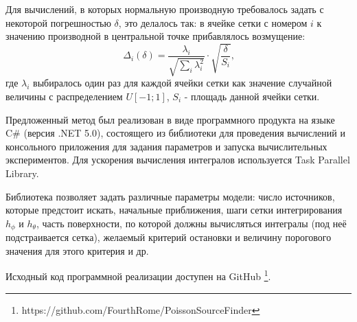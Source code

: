 Для вычислений, в которых нормальную производную требовалось задать с некоторой погрешностью $\delta$, это делалось так: в ячейке сетки с номером $i$ к значению производной в центральной точке прибавлялось возмущение:
\begin{equation}
    \Delta_i(\delta) = \frac{\lambda_i}{\sqrt{\sum_i \lambda_i^2}} \cdot \sqrt{\frac{\delta}{S_i}} \text{,}
\end{equation}
где $\lambda_i$ выбиралось один раз для каждой ячейки сетки как значение случайной величины с распределением $U[-1;1]$, $S_i$ - площадь данной ячейки сетки.

Предложенный метод был реализован в виде программного продукта на языке C\# (версия .NET 5.0), состоящего из библиотеки для проведения вычислений и консольного приложения для задания параметров и запуска вычислительных экспериментов. Для ускорения вычисления интегралов используется Task Parallel Library.

Библиотека позволяет задать различные параметры модели: число источников, которые предстоит искать, начальные приближения, шаги сетки интегрирования $h_\phi$ и $h_\theta$, часть поверхности, по которой должны вычисляться интегралы (под неё подстраивается сетка), желаемый критерий остановки и величину порогового значения для этого критерия и др.

Исходный код программной реализации доступен на GitHub \footnote{https://github.com/FourthRome/PoissonSourceFinder}.
